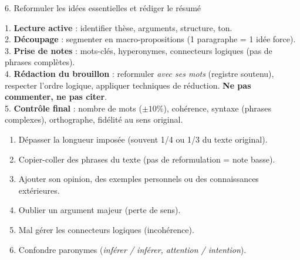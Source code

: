 \documentclass[11pt]{article}
\newcounter{popsec}
\newcounter{popsub}
\newcommand{\courssub}[1]{%
  \stepcounter{popsub}%
  \par\vspace{9pt}\noindent{\popxbold\fontsize{11.5}{13}\selectfont\color{popink}{\color{poporange}\thepopsec.\thepopsub}\hspace{6pt}#1}\par\nopagebreak\vspace{4pt}
}
\begin{document}
\begin{bilan}
\courssub*{6. Reformuler les idées essentielles et rédiger le résumé}
\begin{methode}
1. \textbf{Lecture active} : identifier thèse, arguments, structure, ton.\\
2. \textbf{Découpage} : segmenter en macro-propositions (1 paragraphe = 1 idée force).\\
3. \textbf{Prise de notes} : mots-clés, hyperonymes, connecteurs logiques (pas de phrases complètes).\\
4. \textbf{Rédaction du brouillon} : reformuler \emph{avec ses mots} (registre soutenu), respecter l'ordre logique, appliquer techniques de réduction. \textbf{Ne pas commenter, ne pas citer}.\\
5. \textbf{Contrôle final} : nombre de mots ($\pm 10\%$), cohérence, syntaxe (phrases complexes), orthographe, fidélité au sens original.
\end{methode}

\begin{attention}
\begin{enumerate}
\item Dépasser la longueur imposée (souvent 1/4 ou 1/3 du texte original).
\item Copier-coller des phrases du texte (pas de reformulation = note basse).
\item Ajouter son opinion, des exemples personnels ou des connaissances extérieures.
\item Oublier un argument majeur (perte de sens).
\item Mal gérer les connecteurs logiques (incohérence).
\item Confondre paronymes (\emph{inférer / inférer, attention / intention}).
\end{enumerate}
\end{attention}

\end{bilan}
\end{document}
